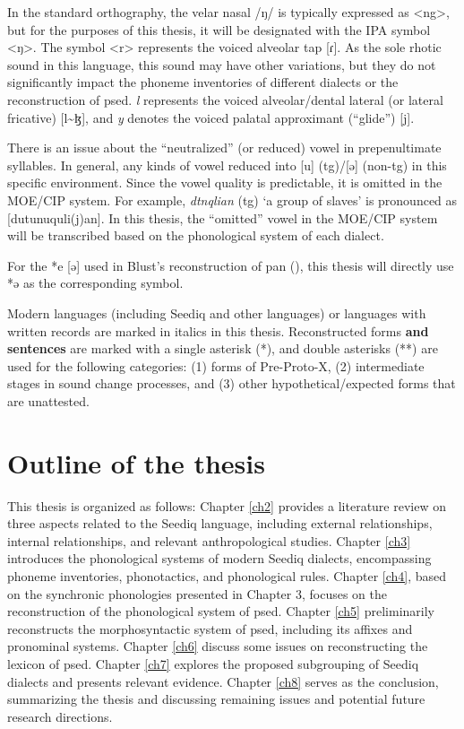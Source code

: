 In the standard orthography, the velar nasal /ŋ/ is typically expressed as <ng>, but for the purposes of this thesis, it will be designated with the IPA symbol <ŋ>. The symbol <r> represents the voiced alveolar tap [ɾ]. As the sole rhotic sound in this language, this sound may have other variations, but they do not significantly impact the phoneme inventories of different dialects or the reconstruction of \acl{psed}. \textit{l} represents the voiced alveolar/dental lateral (or lateral fricative) [l\~{ }ɮ], and \textit{y} denotes the voiced palatal approximant (``glide'') [j].

There is an issue about the ``neutralized'' (or reduced) vowel in prepenultimate syllables. In general, any kinds of vowel reduced into [u] (\ac{tg})/[ə] (non-\ac{tg}) in this specific environment. Since the vowel quality is predictable, it is omitted in the MOE/CIP system. For example, \textit{dtnqlian} (\ac{tg}) `a group of slaves' is pronounced as [dutunuquli(j)an]. In this thesis, the ``omitted'' vowel in the MOE/CIP system will be transcribed based on the phonological system of each dialect. 

For the *e [ə] used in Blust's reconstruction of \acl{pan} (\cite{ACD}), this thesis will directly use *ə as the corresponding symbol. 

Modern languages (including Seediq and other languages) or languages with written records are marked in italics in this thesis. Reconstructed forms \textbf{and sentences} are marked with a single asterisk (*), and double asterisks (**) are used for the following categories: (1) forms of Pre-Proto-X, (2) intermediate stages in sound change processes, and (3) other hypothetical/expected forms that are unattested.

\section{Outline of the thesis}

This thesis is organized as follows: Chapter \ref{ch2} provides a literature review on three aspects related to the Seediq language, including external relationships, internal relationships, and relevant anthropological studies. Chapter \ref{ch3} introduces the phonological systems of modern Seediq dialects, encompassing phoneme inventories, phonotactics, and phonological rules. Chapter \ref{ch4}, based on the synchronic phonologies presented in Chapter 3, focuses on the reconstruction of the phonological system of \acl{psed}. Chapter \ref{ch5} preliminarily reconstructs the morphosyntactic system of \acl{psed}, including its affixes and pronominal systems. Chapter \ref{ch6} discuss some issues on reconstructing the lexicon of \acl{psed}. Chapter \ref{ch7} explores the proposed subgrouping of Seediq dialects and presents relevant evidence. Chapter \ref{ch8} serves as the conclusion, summarizing the thesis and discussing remaining issues and potential future research directions.